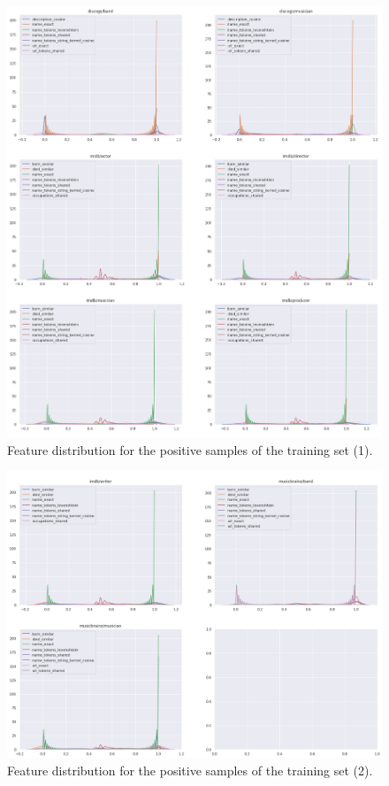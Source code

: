 \documentclass[epsfig,a4paper,11pt,titlepage,twoside,openany]{book}
\begin{document}
\begin{figure}[H]
      \centering
      \includegraphics[width=\linewidth]{features_distribution_positive_samples_1}
      \caption{Feature distribution for the positive samples of the training set (1).}
      \label{fig:distribution-of-training-positive-features-1}
\end{figure}

\begin{figure}[H]
      \centering
      \includegraphics[width=\linewidth]{features_distribution_positive_samples_2}
      \caption{Feature distribution for the positive samples of the training set (2).}
      \label{fig:distribution-of-training-positive-features-2}
\end{figure}
\end{document}
